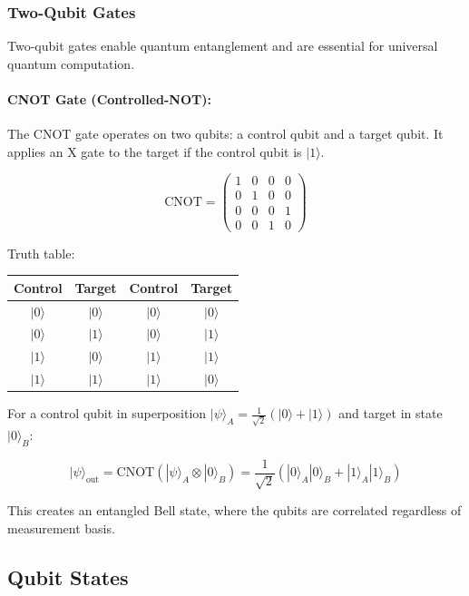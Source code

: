 \documentclass{article}
\begin{document}
\subsubsection*{Two-Qubit Gates}

Two-qubit gates enable quantum entanglement and are essential for universal quantum computation.

\paragraph{CNOT Gate (Controlled-NOT):}

The CNOT gate operates on two qubits: a control qubit and a target qubit. It applies an X gate to the target if the control qubit is $|1\rangle$.

$$\text{CNOT} = \begin{pmatrix} 1 & 0 & 0 & 0 \\ 0 & 1 & 0 & 0 \\ 0 & 0 & 0 & 1 \\ 0 & 0 & 1 & 0 \end{pmatrix}$$

Truth table:

\begin{center}
\begin{tabular}{cc|cc}
\hline
Control & Target & Control & Target \\
\hline
$|0\rangle$ & $|0\rangle$ & $|0\rangle$ & $|0\rangle$ \\
$|0\rangle$ & $|1\rangle$ & $|0\rangle$ & $|1\rangle$ \\
$|1\rangle$ & $|0\rangle$ & $|1\rangle$ & $|1\rangle$ \\
$|1\rangle$ & $|1\rangle$ & $|1\rangle$ & $|0\rangle$ \\
\hline
\end{tabular}
\end{center}

For a control qubit in superposition $|\psi\rangle_A = \frac{1}{\sqrt{2}}(|0\rangle + |1\rangle)$ and target in state $|0\rangle_B$:

$$|\psi\rangle_{\text{out}} = \text{CNOT}(|\psi\rangle_A \otimes |0\rangle_B) = \frac{1}{\sqrt{2}}(|0\rangle_A|0\rangle_B + |1\rangle_A|1\rangle_B)$$

This creates an entangled Bell state, where the qubits are correlated regardless of measurement basis.

\subsection{Qubit States}
\end{document}
